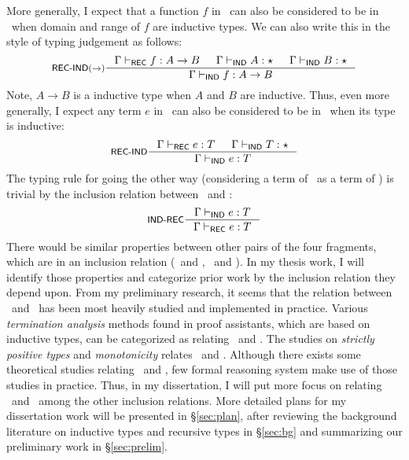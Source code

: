 More generally, I expect that a function $f$ in \REC\ can also be considered
to be in \IND\ when domain and range of $f$ are inductive types.
We can also write this in the style of typing judgement as follows:
\[\inference[\REC-\IND($\to$)]{ \Gamma |-_\REC f:A\to B
                      & \Gamma |-_\IND A:\star
                      & \Gamma |-_\IND B:\star }
                      { \Gamma |-_\IND f:A\to B } \]
Note, $A\to B$ is a inductive type when $A$ and $B$ are inductive. Thus,
even more generally, I expect any term $e$ in \REC\ can also be considered
to be in \IND\ when its type is inductive:
\[\inference[\REC-\IND]{ \Gamma |-_\REC e:T
                       & \Gamma |-_\IND T:\star }
                       { \Gamma |-_\IND e:T } \]
The typing rule for going the other way (\ie considering a term of \IND\
as a term of \REC) is trivial by the inclusion relation between \IND\ and \REC:
\[\inference[\IND-\REC]{ \Gamma |-_\IND e:T }
                       { \Gamma |-_\REC e:T } \]
There would be similar properties between other pairs of the four fragments,
which are in an inclusion relation (\eg \IND\ and \INDbot,
\INDbot\ and \RECbot). In my thesis work, I will identify those properties
and categorize prior work by the inclusion relation they depend upon.
From my preliminary research, it seems that the relation between
\IND\ and \INDbot\ has been most heavily studied and implemented in practice.
Various \emph{termination analysis} methods found in proof assistants,
which are based on inductive types, can be categorized as relating
\IND\ and \INDbot. The studies on \emph{strictly positive types} and
\emph{monotonicity} relates \IND\ and \REC. Although there exists some
theoretical studies relating \REC\ and \RECbot, few formal reasoning system
make use of those studies in practice. Thus, in my dissertation, I will put
more focus on relating \REC\ and \RECbot\ among the other inclusion relations.
More detailed plans for my dissertation work will be presented
in \S\ref{sec:plan}, after reviewing the background literature on
inductive types and recursive types in \S\ref{sec:bg}
and summarizing our preliminary work in \S\ref{sec:prelim}.

